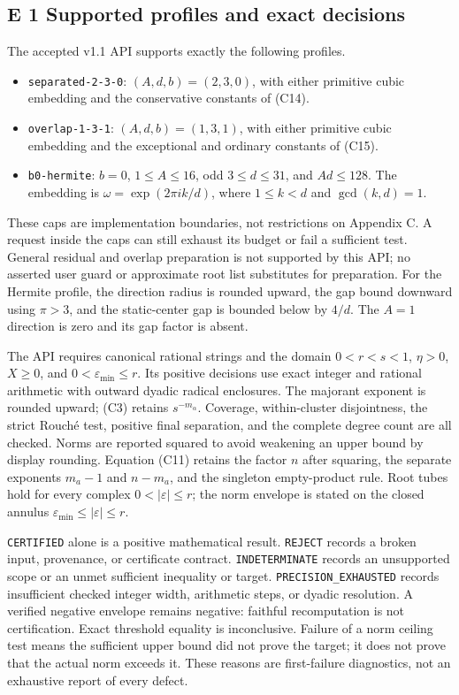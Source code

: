 \documentclass[
  11pt,
]{article}
\begin{document}
\subsection{E 1 Supported profiles and exact decisions}

The accepted v1.1 API supports exactly the following profiles.
\begin{itemize}
\item \texttt{separated-2-3-0}: \((A,d,b)=(2,3,0)\), with either
primitive cubic embedding and the conservative constants of (C14).
\item \texttt{overlap-1-3-1}: \((A,d,b)=(1,3,1)\), with either
primitive cubic embedding and the exceptional and ordinary constants of
(C15).
\item \texttt{b0-hermite}: \(b=0\), \(1\leq A\leq16\), odd
\(3\leq d\leq31\), and \(Ad\leq128\). The embedding is
\(\omega=\exp(2\pi i k/d)\), where \(1\leq k<d\) and
\(\gcd(k,d)=1\).
\end{itemize}
These caps are implementation boundaries, not restrictions on Appendix C.
A request inside the caps can still exhaust its budget or fail a sufficient
test. General residual and overlap preparation is not supported by this API;
no asserted user guard or approximate root list substitutes for preparation.
For the Hermite profile, the direction radius is rounded upward, the gap
bound downward using \(\pi>3\), and the static-center gap is bounded below
by \(4/d\). The \(A=1\) direction is zero and its gap factor is absent.

The API requires canonical rational strings and the domain
\(0<r<s<1\), \(\eta>0\), \(X\geq0\), and
\(0<\varepsilon_{\min}\leq r\). Its positive decisions use exact
integer and rational arithmetic with outward dyadic radical enclosures.
The majorant exponent is rounded upward; (C3) retains
\(s^{-m_\alpha}\). Coverage, within-cluster disjointness, the strict
Rouch\'e test, positive final separation, and the complete degree count
are all checked. Norms are reported squared to avoid weakening an upper
bound by display rounding. Equation (C11) retains the factor \(n\) after
squaring, the separate exponents \(m_a-1\) and \(n-m_a\), and the
singleton empty-product rule. Root tubes hold for every complex
\(0<|\varepsilon|\leq r\); the norm envelope is stated on the
closed annulus \(\varepsilon_{\min}\leq|\varepsilon|\leq r\).

\texttt{CERTIFIED} alone is a positive mathematical result.
\texttt{REJECT} records a broken input, provenance, or certificate contract.
\texttt{INDETERMINATE} records an unsupported scope or an unmet sufficient
inequality or target. \texttt{PRECISION\_EXHAUSTED} records insufficient
checked integer width, arithmetic steps, or dyadic resolution. A verified
negative envelope remains negative: faithful recomputation is not
certification. Exact threshold equality is inconclusive. Failure of a norm
ceiling test means the sufficient upper bound did not prove the target;
it does not prove that the actual norm exceeds it. These reasons are
first-failure diagnostics, not an exhaustive report of every defect.
\end{document}
